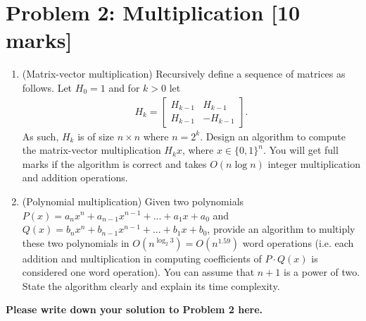 \documentclass[11pt,twoside]{article}
\newcommand{\problem}[1]{\section*{Problem #1}}
\newenvironment{solution}{{\par\noindent\it Solution.}}{}
\begin{document}
\problem{2: Multiplication [10 marks]}
\begin{enumerate}
    \item (Matrix-vector multiplication) 
Recursively define a sequence of matrices as follows.
Let $H_0=1$ and for $k>0$ let 
\begin{align}
    H_k=
    \begin{bmatrix}
    H_{k-1} & H_{k-1}\\
    H_{k-1} & -H_{k-1} 
    \end{bmatrix}. 
\end{align}
As such, $H_k$ is of size $n\times n$ where $n=2^k$. Design an algorithm to compute the matrix-vector multiplication $H_k x$, where $x\in\{0,1\}^n$. You will get full marks if the algorithm is correct and takes $O(n\log n)$ integer multiplication and addition operations.
\item (Polynomial multiplication) Given two polynomials $P(x) = a_nx^n + a_{n-1}x^{n-1} + ... + a_1x + a_0$ and $Q(x) = b_nx^n + b_{n-1}x^{n-1} + ... + b_1x + b_0$, provide an algorithm to multiply these two polynomials in $O(n^{\log_2 3}) = O(n^{1.59})$ word operations (i.e. each addition and multiplication in computing coefficients of $P\cdot Q(x)$ is considered one word operation).
You can assume that $n + 1$ is a power of two.  State the algorithm clearly and explain its time complexity.
\end{enumerate}
\begin{solution}
\textbf{Please write down your solution to Problem 2 here.}
\end{solution}
    
\end{document}
